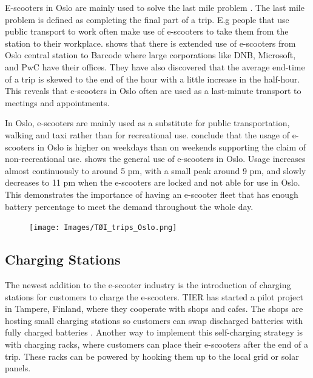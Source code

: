 E-scooters in Oslo are mainly used to solve the last mile problem \citep{fearnley_delte_2020}. The last mile problem is defined as completing the final part of a trip. E.g people that use public transport to work often make use of e-scooters to take them from the station to their workplace.  \citet{fearnley_delte_2020} shows that there is extended use of e-scooters from Oslo central station to Barcode where large corporations like DNB, Microsoft, and PwC have their offices. They have also discovered that the average end-time of a trip is skewed to the end of the hour with a little increase in the half-hour. This reveals that e-scooters in Oslo often are used as a last-minute transport to meetings and appointments. 

In Oslo, e-scooters are mainly used as a substitute for public transportation, walking and taxi rather than for recreational use. \citet{fearnley_delte_2020} conclude that the usage of e-scooters in Oslo is higher on weekdays than on weekends supporting the claim of non-recreational use.  shows the general use of e-scooters in Oslo. Usage increases almost continuously to around 5 pm, with a small peak around 9 pm, and slowly decreases to 11 pm when the e-scooters are locked and not able for use in Oslo. This demonstrates the importance of having an e-scooter fleet that has enough battery percentage to meet the demand throughout the whole day. 
 \\
\begin{figure}[H]
    \centering
    \texttt{[image: Images/TØI\_trips\_Oslo.png]}
    \label{fig:TOI_trips}
\end{figure}


\subsection{Charging Stations}\label{sharging stations}

The newest addition to the e-scooter industry is the introduction of charging stations for customers to charge the e-scooters. TIER has started a pilot project in Tampere, Finland, where they cooperate with shops and cafes. The shops are hosting small charging stations so customers can swap discharged batteries with fully charged batteries \citep{plikk_slik_2019}. Another way to implement this self-charging strategy is with charging racks, where customers can place their e-scooters after the end of a trip. These racks can be powered by hooking them up to the local grid or solar panels. 

